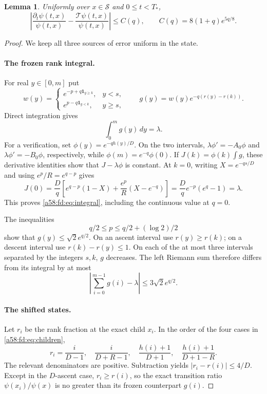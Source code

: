 \documentclass[11pt,letterpaper]{article}
\newtheorem{lemma}[theorem]{Lemma}
\theoremstyle{remark}
\newcommand{\TT}{\mathcal T}
\newcommand{\one}{\mathbf 1}
\begin{document}
\begin{lemma}\label{a58:fd:lem:residual}
Uniformly over $x\in\mathcal S$ and $0\le t<T_*$,
\begin{equation}\label{a58:fd:eq:residual}
 \left|\frac{\partial_t\psi(t,x)}{\psi(t,x)}
       -\frac{\TT\psi(t,x)}{\psi(t,x)}\right|
 \le C(q),\qquad C(q)=8(1+q)e^{5q/8}.
\end{equation}
\end{lemma}
\begin{proof}
We keep all three sources of error uniform in the state.

\paragraph{The frozen rank integral.}
For real $y\in[0,m]$ put
\[
 w(y)=\begin{cases}
 e^{-p+q\one_{y\ge k}},&y<s,\\
 e^{p-q\one_{y<k}},&y\ge s,
 \end{cases}
 \qquad g(y)=w(y)e^{-q(r(y)-r(k))}.
\]
Direct integration gives
\begin{equation}\label{a58:fd:eq:integral}
 \int_0^m g(y)\,dy=\lambda.
\end{equation}
For a verification, set $\phi(y)=e^{-qh(y)/D}$. On the two intervals,
$\lambda\phi'=-A_0\phi$ and $\lambda\phi'=-B_0\phi$, respectively, while
$\phi(m)=e^{-q}\phi(0)$. If $J(k)=\phi(k)\int g$, these derivative identities show that $J-\lambda\phi$ is constant. At $k=0$, writing $X=e^{-qs/D}$ and using $e^p/R=e^{q-p}$ gives
\[
 J(0)=\frac Dq\left[e^{q-p}(1-X)+\frac{e^p}{R}(X-e^{-q})\right]
     =\frac Dq e^{-p}(e^q-1)=\lambda.
\]
This proves \eqref{a58:fd:eq:integral}, including the continuous value at $q=0$.

The inequalities
\[
 q/2\le p\le q/2+(\log2)/2
\]
show that $g(y)\le\sqrt2e^{q/2}$. On an ascent interval use $r(y)\ge r(k)$; on a descent interval use $r(k)-r(y)\le1$. On each of the at most three intervals separated by the integers $s,k$, $g$ decreases. The left Riemann sum therefore differs from its integral by at most
\begin{equation}\label{a58:fd:eq:quaderror}
 \left|\sum_{i=0}^{m-1}g(i)-\lambda\right|\le3\sqrt2e^{q/2}.
\end{equation}

\paragraph{The shifted states.}
Let $r_i$ be the rank fraction at the exact child $x_i$. In the order of the four cases in \eqref{a58:fd:eq:children},
\begin{equation}\label{a58:fd:eq:rankchildren}
 r_i=\frac{i}{D-1},\quad
 \frac{i}{D+R-1},\quad
 \frac{h(i)+1}{D+1},\quad
 \frac{h(i)+1}{D+1-R}.
\end{equation}
The relevant denominators are positive. Subtraction yields $|r_i-r(i)|\le4/D$. Except in the $D$-ascent case, $r_i\ge r(i)$, so the exact transition ratio $\psi(x_i)/\psi(x)$ is no greater than its frozen counterpart $g(i)$.


\end{proof}
\end{document}
